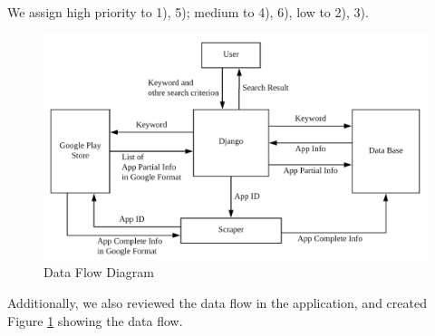 \documentclass[12pt, a4paper]{article}
\begin{document}
We assign high priority to 1), 5); medium to 4), 6), low to 2), 3).

\begin{figure}[ht]
\includegraphics[width=\textwidth]{dataFlow.png}
\caption{Data Flow Diagram}
\label{fig:dataFlow}
\end{figure}


Additionally, we also reviewed the data flow in the application, and created Figure \ref{fig:dataFlow} showing the data flow.
\end{document}
